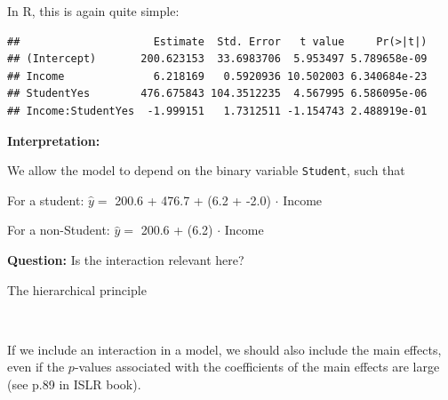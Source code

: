 \documentclass[10pt,ignorenonframetext,]{beamer}
\newenvironment{Shaded}{\begin{snugshade}}{\end{snugshade}}
\newcommand{\KeywordTok}[1]{\textcolor[rgb]{0.13,0.29,0.53}{\textbf{#1}}}
\newcommand{\StringTok}[1]{\textcolor[rgb]{0.31,0.60,0.02}{#1}}
\newcommand{\OperatorTok}[1]{\textcolor[rgb]{0.81,0.36,0.00}{\textbf{#1}}}
\newcommand{\NormalTok}[1]{#1}
\begin{document}
\begin{frame}[fragile]

In R, this is again quite simple:

\scriptsize

\begin{Shaded}
\end{Shaded}

\begin{verbatim}
##                     Estimate  Std. Error   t value     Pr(>|t|)
## (Intercept)       200.623153  33.6983706  5.953497 5.789658e-09
## Income              6.218169   0.5920936 10.502003 6.340684e-23
## StudentYes        476.675843 104.3512235  4.567995 6.586095e-06
## Income:StudentYes  -1.999151   1.7312511 -1.154743 2.488919e-01
\end{verbatim}

\normalsize

\textbf{Interpretation:}

We allow the model to depend on the binary variable \texttt{Student},
such that

For a student: \(\hat{y} =\) 200.6 + 476.7 + (6.2 + -2.0) \(\cdot\)
Income

For a non-Student: \(\hat{y} =\) 200.6 + (6.2) \(\cdot\) Income

\vspace{2mm}

\textbf{Question:} Is the interaction relevant here?

\end{frame}

\begin{frame}

\begin{block}{The hierarchical principle}

\(~\)

If we include an interaction in a model, we should also include the main
effects, even if the \(p\)-values associated with the coefficients of
the main effects are large (see p.89 in ISLR book).

\end{block}

\end{frame}
\end{document}
